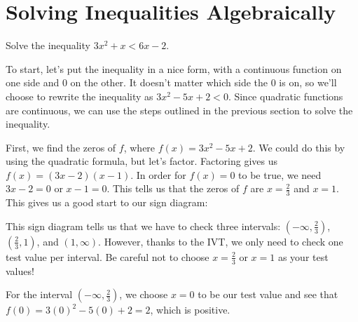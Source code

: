 \documentclass[noauthor, nooutcomes]{ximera}
\begin{document}
\section{Solving Inequalities Algebraically}
\begin{example}
Solve the inequality $3x^2 + x < 6x - 2$.
\end{example}
\begin{explanation}
To start, let's put the inequality in a nice form, with a continuous function on one side and 0 on the other. It doesn't matter which side the 0 is on, so we'll choose to rewrite the inequality as $3x^2 - 5x + 2 < 0$. Since quadratic functions are continuous, we can use the steps outlined in the previous section to solve the inequality.

First, we find the zeros of $f$, where $f(x) = 3x^2 - 5x + 2$. We could do this by using the quadratic formula, but let's factor. Factoring gives us $f(x) = (3x - 2)(x - 1)$. In order for $f(x) = 0$ to be true, we need $3x - 2 = 0$ or $x - 1 = 0$. This tells us that the zeros of $f$ are $x= \frac{2}{3}$ and $x = 1$. This gives us a good start to our sign diagram:

\begin{image}
\end{image}

This sign diagram tells us that we have to check three intervals: $\left(-\infty, \frac{2}{3}\right)$, $\left(\frac{2}{3}, 1\right)$, and $(1, \infty)$. However, thanks to the IVT, we only need to check one test value per interval. Be careful not to choose $x = \frac{2}{3}$ or $x = 1$ as your test values!

For the interval $\left(-\infty, \frac{2}{3}\right)$, we choose $x = 0$ to be our test value and see that $f(0) = 3(0)^2 - 5(0) + 2 = 2$, which is positive. 


\end{explanation}
\end{document}
